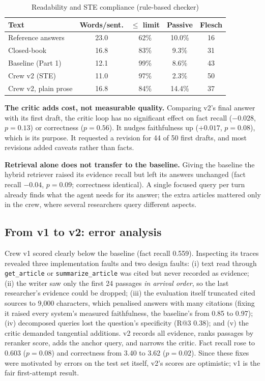 \documentclass[conference]{IEEEtran}
\begin{document}
\begin{table}[t]
\caption{Readability and STE compliance (rule-based checker)}
\label{tab:ste}
\centering
\setlength{\tabcolsep}{4pt}
\begin{tabular}{lcccc}
\toprule
Text & Words/sent. & $\le$ limit & Passive & Flesch \\
\midrule
Reference answers      & 23.0 & 62\% & 10.0\% & 16 \\
Closed-book            & 16.8 & 83\% & 9.3\% & 31 \\
Baseline (Part 1)      & 12.1 & 99\% & 8.6\% & 43 \\
Crew v2 (STE)          & 11.0 & 97\% & 2.3\% & 50 \\
Crew v2, plain prose   & 16.8 & 84\% & 14.4\% & 37 \\
\bottomrule
\end{tabular}
\end{table}

\textbf{The critic adds cost, not measurable quality.} Comparing v2's final answer with its first draft, the critic
loop has no significant effect on fact recall ($-0.028$, $p=0.13$) or correctness ($p=0.56$). It nudges
faithfulness up ($+0.017$, $p=0.08$), which is its purpose. It requested a revision for 44 of 50 first drafts, and
most revisions added caveats rather than facts.

\textbf{Retrieval alone does not transfer to the baseline.} Giving the baseline the hybrid retriever raised its
evidence recall but left its answers unchanged (fact recall $-0.04$, $p=0.09$; correctness identical). A single
focused query per turn already finds what the agent needs for its answer; the extra articles mattered only in the
crew, where several researchers query different aspects.

\subsection{From v1 to v2: error analysis}
\label{sec:v2}
Crew v1 scored clearly below the baseline (fact recall 0.559). Inspecting its traces revealed three
implementation faults and two design faults:
(i) text read through \texttt{get\_article} or \texttt{summarize\_article} was cited but never recorded as
evidence;
(ii) the writer saw only the first 24 passages \emph{in arrival order}, so the last researcher's evidence could be
dropped;
(iii) the evaluation itself truncated cited sources to 9{,}000 characters, which penalised answers with many
citations (fixing it raised every system's measured faithfulness, the baseline's from 0.85 to 0.97);
(iv) decomposed queries lost the question's specificity (R@3 0.38); and (v) the critic demanded tangential
additions. v2 records all evidence, ranks passages by reranker score, adds the anchor query, and narrows the
critic. Fact recall rose to 0.603 ($p=0.08$) and correctness from 3.40 to 3.62 ($p=0.02$). Since these fixes were
motivated by errors on the test set itself, v2's scores are optimistic; v1 is the fair first-attempt result.
\end{document}
